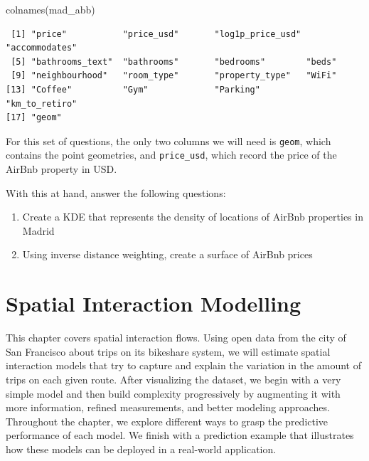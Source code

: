 \documentclass[
  letterpaper,
  DIV=11,
  numbers=noendperiod,
  oneside]{scrreprt}
\newenvironment{Shaded}{\begin{snugshade}}{\end{snugshade}}
\newcommand{\FunctionTok}[1]{\textcolor[rgb]{0.28,0.35,0.67}{#1}}
\newcommand{\NormalTok}[1]{\textcolor[rgb]{0.00,0.23,0.31}{#1}}
\providecommand{\tightlist}{%
  \setlength{\itemsep}{0pt}\setlength{\parskip}{0pt}}\usepackage{longtable,booktabs,array}
\begin{document}
\begin{Shaded}
\begin{Highlighting}[]
\FunctionTok{colnames}\NormalTok{(mad\_abb)}
\end{Highlighting}
\end{Shaded}

\begin{verbatim}
 [1] "price"           "price_usd"       "log1p_price_usd" "accommodates"   
 [5] "bathrooms_text"  "bathrooms"       "bedrooms"        "beds"           
 [9] "neighbourhood"   "room_type"       "property_type"   "WiFi"           
[13] "Coffee"          "Gym"             "Parking"         "km_to_retiro"   
[17] "geom"           
\end{verbatim}

For this set of questions, the only two columns we will need is
\texttt{geom}, which contains the point geometries, and
\texttt{price\_usd}, which record the price of the AirBnb property in
USD.

With this at hand, answer the following questions:

\begin{enumerate}
\def\labelenumi{\arabic{enumi}.}
\tightlist
\item
  Create a KDE that represents the density of locations of AirBnb
  properties in Madrid
\item
  Using inverse distance weighting, create a surface of AirBnb prices
\end{enumerate}


\chapter{Spatial Interaction Modelling}\label{sec-chp5}

This chapter covers spatial interaction flows. Using open data from the
city of San Francisco about trips on its bikeshare system, we will
estimate spatial interaction models that try to capture and explain the
variation in the amount of trips on each given route. After visualizing
the dataset, we begin with a very simple model and then build complexity
progressively by augmenting it with more information, refined
measurements, and better modeling approaches. Throughout the chapter, we
explore different ways to grasp the predictive performance of each
model. We finish with a prediction example that illustrates how these
models can be deployed in a real-world application.
\end{document}
